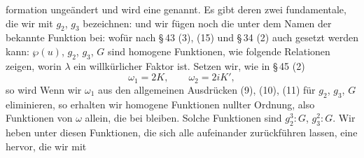 formation ungeändert und wird eine  genannt. Es gibt deren zwei fundamentale,
die wir mit $g_2$, $g_3$ bezeichnen:
und wir fügen noch die unter dem Namen der  bekannte Funktion bei:
wofür nach §\,43 (3), (15) und §\,34 (2) auch gesetzt werden kann:
$\wp(u)$, $g_2$, $g_3$, $G$ sind homogene Funktionen, wie folgende Relationen zeigen, worin
$\lambda$ ein willkürlicher Faktor ist.
Setzen wir, wie in §\,45 (2)
\[ \omega_1 = 2K, \qquad \omega_2 = 2iK', \]
so wird
Wenn wir $\omega_1$ aus den allgemeinen Ausdrücken (9), (10), (11) für $g_2$, $g_3$, $G$
eliminieren, so erhalten wir homogene Funktionen nullter Ordnung, also Funktionen von
$\omega$ allein, die bei  bleiben. Solche Funktionen
sind $g_2^3:G$, $g_3^2:G$. Wir heben unter diesen Funktionen, die sich alle aufeinander
zurückführen lassen, eine hervor, die wir mit

